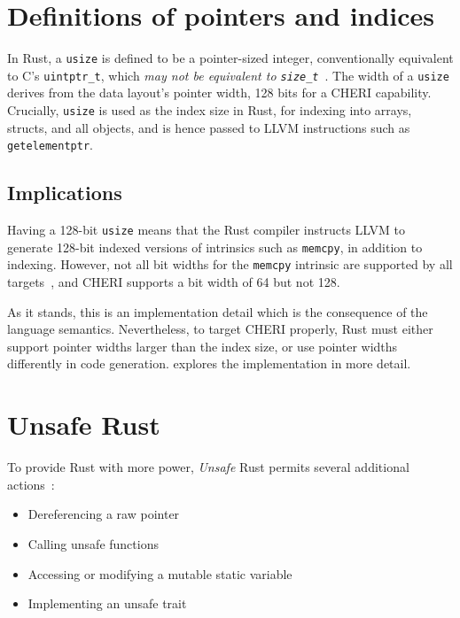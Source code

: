\documentclass[dissertation.tex]{subfiles}
\begin{document}
\section{Definitions of pointers and indices}
\label{sec:rust-usize}

In Rust, a \texttt{usize} is defined to be a pointer-sized integer,
conventionally equivalent to C's \texttt{uintptr\_t}, which \emph{may
not be equivalent to \texttt{size\_t}}~\cite{rust-rfc-isize}.
The width of a \texttt{usize} derives from the data layout's pointer
width, 128 bits for a CHERI capability.
Crucially, \texttt{usize} is used as the index size in Rust, for
indexing into arrays, structs, and all objects, and is hence passed to
LLVM instructions such as \texttt{getelementptr}.

\subsection{Implications}
Having a 128-bit \texttt{usize} means that the Rust compiler instructs
LLVM to generate 128-bit indexed versions of intrinsics such as
\texttt{memcpy}, in addition to indexing.
However, not all bit widths for the \texttt{memcpy} intrinsic are
supported by all targets~\cite{llvm-langref}, and CHERI supports a bit
width of 64 but not 128.

As it stands, this is an implementation detail which is the consequence
of the language semantics.
Nevertheless, to target CHERI properly, Rust must either support pointer
widths larger than the index size, or use pointer widths differently in
code generation.
 explores the implementation in more detail.


\section{Unsafe Rust}
\label{sec:rust-unsafe}

To provide Rust with more power, \emph{Unsafe} Rust permits several
additional actions~\cite{rust-trpl-book}:

\begin{itemize}
    \item Dereferencing a raw pointer
    \item Calling unsafe functions
    \item Accessing or modifying a mutable static variable
    \item Implementing an unsafe trait
\end{itemize}
\end{document}
